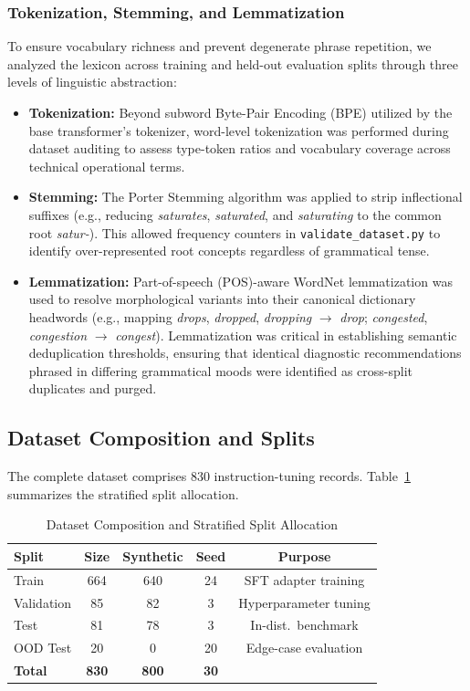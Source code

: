 \documentclass[conference]{IEEEtran}
\begin{document}
\subsubsection{Tokenization, Stemming, and Lemmatization}
To ensure vocabulary richness and prevent degenerate phrase repetition, we analyzed the lexicon across training and held-out evaluation splits through three levels of linguistic abstraction:
\begin{itemize}
    \item \textbf{Tokenization:} Beyond subword Byte-Pair Encoding (BPE) utilized by the base transformer's tokenizer, word-level tokenization was performed during dataset auditing to assess type-token ratios and vocabulary coverage across technical operational terms.
    \item \textbf{Stemming:} The Porter Stemming algorithm was applied to strip inflectional suffixes (e.g., reducing \textit{saturates}, \textit{saturated}, and \textit{saturating} to the common root \textit{satur-}). This allowed frequency counters in \texttt{validate\_dataset.py} to identify over-represented root concepts regardless of grammatical tense.
    \item \textbf{Lemmatization:} Part-of-speech (POS)-aware WordNet lemmatization was used to resolve morphological variants into their canonical dictionary headwords (e.g., mapping \textit{drops}, \textit{dropped}, \textit{dropping} $\to$ \textit{drop}; \textit{congested}, \textit{congestion} $\to$ \textit{congest}). Lemmatization was critical in establishing semantic deduplication thresholds, ensuring that identical diagnostic recommendations phrased in differing grammatical moods were identified as cross-split duplicates and purged.
\end{itemize}

\subsection{Dataset Composition and Splits}

The complete dataset comprises 830 instruction-tuning records. Table~\ref{tab:dataset} summarizes the stratified split allocation.

\begin{table}[htbp]
\centering
\caption{Dataset Composition and Stratified Split Allocation}
\label{tab:dataset}
\begin{tabular}{lcccc}
\toprule
\textbf{Split} & \textbf{Size} & \textbf{Synthetic} & \textbf{Seed} & \textbf{Purpose} \\
\midrule
Train      & 664 & 640 & 24 & SFT adapter training \\
Validation & 85  & 82  & 3  & Hyperparameter tuning \\
Test       & 81  & 78  & 3  & In-dist.\ benchmark \\
OOD Test   & 20  & 0   & 20 & Edge-case evaluation \\
\midrule
\textbf{Total} & \textbf{830} & \textbf{800} & \textbf{30} & \\
\bottomrule
\end{tabular}
\end{table}
\end{document}
